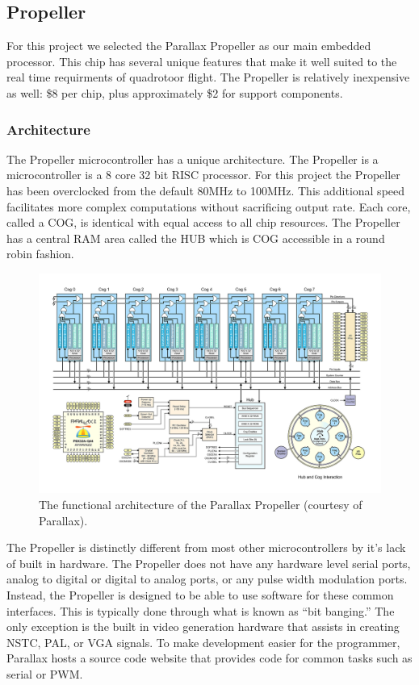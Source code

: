 \documentclass{article}
\numberwithin{equation}{section} %
\begin{document}
\subsection{Propeller}
For this project we selected the Parallax Propeller as our main embedded processor. This chip has several unique features that make it well suited to the real time requirments of quadrotoor flight. The Propeller is relatively inexpensive as well: \$8 per chip, plus approximately \$2 for support components.

\subsubsection{Architecture}

The Propeller microcontroller has a unique architecture. The Propeller is a microcontroller is a 8 core 32 bit RISC processor. For this project the Propeller has been overclocked from the default 80MHz to 100MHz. This additional speed facilitates more complex computations without sacrificing output rate. Each core, called a COG, is identical with equal access to all chip resources. The Propeller has a central RAM area called the HUB which is COG accessible in a round robin fashion.

\begin{figure}[h!]
  \centering
	\includegraphics[scale=.17]{PropellerArchitecture.jpg}
  \caption{The functional architecture of the Parallax Propeller (courtesy of Parallax).}
\end{figure}  

The Propeller is distinctly different from most other microcontrollers by it's lack of built in hardware. The Propeller does not have any hardware level serial ports, analog to digital or digital to analog ports, or any pulse width modulation ports. Instead, the Propeller is designed to be able to use software for these common interfaces. This is typically done through what is known as “bit banging.” The only exception is the built in video generation hardware that assists in creating NSTC, PAL, or VGA signals. To make development easier for the programmer, Parallax hosts a source code website that provides code for common tasks such as serial or PWM.
\end{document}
